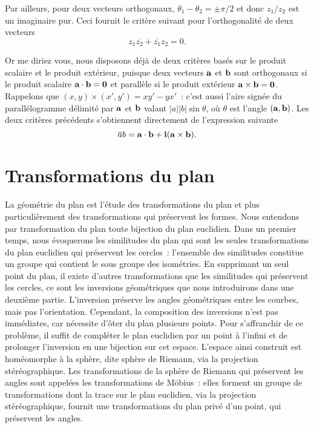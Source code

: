 Par ailleurs, pour deux vecteurs orthogonaux, $\theta_1-\theta_2=\pm \pi/2$ et donc $z_1/z_2$ est un imaginaire pur. Ceci fournit le critère suivant pour l'orthogonalité de deux vecteurs
$$z_1\overline{z_2} + \overline{z_1}z_2=0.$$

Or me diriez vous, nous disposons déjà de deux critères basés sur le produit scalaire et le produit extérieur, puisque deux vecteurs $\bf a$ et $\bf b$ sont orthogonaux si le produit scalaire $\bf a \cdot b=0$ et parallèle si le produit extérieur $\bf a \times b=0$. Rappelons que $(x,y) \times (x',y')=xy'-yx'$~: c'est aussi l'aire signée du parallélogramme délimité par $\bf a$ et $\bf b$ valant $|a| |b|\sin \theta$, où $\theta$ est l'angle $(\bf{a},\bf{b})$. Les deux critères précédents s'obtiennent directement de l'expression suivante 
$$\overline{a}b=\bf{a} \cdot \bf{b} + i (\bf{a}\times \bf{b}).$$


\section{Transformations du plan}

La géométrie du plan est l'étude des transformations du plan et plus particulièrement des transformations qui préservent les formes. Nous entendons par transformation du plan toute bijection du plan euclidien. Dans un premier temps, nous évoquerons les similitudes du plan qui sont les seules transformations du plan euclidien qui préservent les cercles~: l'ensemble des similitudes constitue un groupe qui contient le sous groupe des isométries. En supprimant un seul point du plan, il existe d'autres transformations que les similitudes qui préservent les cercles, ce sont les inversions géométriques que nous introduirons dans une deuxième partie. L'inversion préserve les angles géométriques entre les courbes, mais pas l'orientation. Cependant, la composition des inversions n'est pas immédiates, car nécessite d'ôter du plan plusieurs points. Pour s'affranchir de ce problème, il suffit de compléter le plan euclidien par un point à l'infini et de prolonger l'inversion en une bijection sur cet espace. L'espace ainsi construit est homéomorphe à la sphère, dite sphère de Riemann, via la projection stéréographique. Les transformations de la sphère de Riemann qui préservent les angles sont appelées les transformations de Möbius~: elles forment un groupe de transformations dont la trace sur le plan euclidien, via la projection stéréographique, fournit une transformations du plan privé d'un point, qui préservent les angles. 
 
